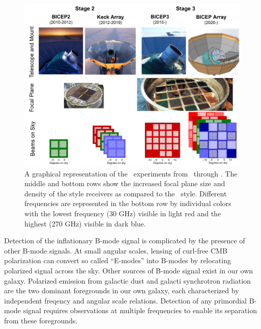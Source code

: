 \documentclass[]{spie}  %
\begin{document}
\begin{figure}[h]
	\center
	\includegraphics[scale=0.5]{progression.pdf}
	\caption{A graphical representation of the \bk \ experiments from 
	\ through \biceparray. The middle and bottom rows show the increased focal plane size and density of the  style receivers as compared to the  \ style. Different
	frequencies are represented in the bottom row by individual colors with the lowest frequency
	(30 GHz) visible in light red and the highest (270 GHz) visible in dark
	blue.}
	\label{fig:progression}
\end{figure}

Detection of the inflationary B-mode signal is complicated by the presence of
other B-mode signals. At small angular scales, lensing of curl-free CMB
polarization can convert so called ``E-modes'' into B-modes by relocating
polarized signal across the sky. Other sources of B-mode signal exist in our
own galaxy. Polarized emission from galactic dust and galacti synchrotron
radiation are the two dominant foregrounds in our own galaxy, each
characterized by independent freqency and angular scale relations. Detection
of any primordial B-mode signal requires observations at multiple frequencies
to enable its separation from these foregrounds. 
\end{document}
